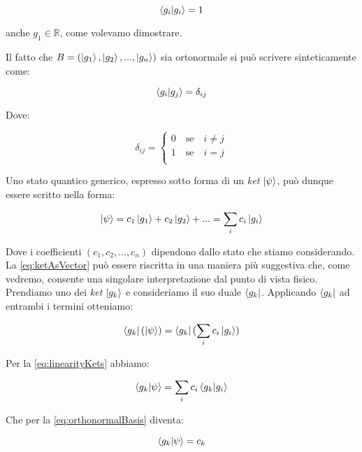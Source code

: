     \[
        \braket{g_i}{g_i} = 1
    \]
    
anche $g_1 \in \mathbb{R}$, come volevamo dimostrare.
    
Il fatto che $B = ( \ket{g_1}, \ket{g_2}, ..., \ket{g_n} ) $ sia ortonormale si può scrivere sinteticamente come: 

	\begin{equation} \label{eq:orthonormalBasis}
		\braket{g_i}{g_j} = \delta_{ij}
	\end{equation}

Dove:

 	\begin{equation}
		\delta_{ij} = \left \{ \begin{array}{l}
				0 \quad \text{se} \quad i \neq j \\
				1 \quad \text{se} \quad i = j \\
			\end{array}
		\right.
	\end{equation}


Uno stato quantico generico, espresso sotto forma di un \textit{ket} $\ket{\psi}$, può dunque essere scritto nella forma:

	\begin{equation} \label{eq:ketAsVector}
		\ket{\psi} = c_1 \ket{g_1} + c_2 \ket{g_2} + ... = \sum_i c_i \ket{g_i}
	\end{equation}

Dove i coefficienti $(c_1, c_2, ..., c_n)$ dipendono dallo stato che stiamo considerando. La \eqref{eq:ketAsVector} può essere riscritta in una maniera più suggestiva che, come vedremo, consente una singolare interpretazione dal punto di vista fisico. Prendiamo uno dei \textit{ket} $\ket{g_k}$ e consideriamo il suo duale $\bra{g_k}$. Applicando $\bra{g_k}$ ad entrambi i termini otteniamo:

	\begin{equation}
		\bra{g_k}(\ket{\psi}) = \bra{g_k}(\sum_i c_i \ket{g_i})
	\end{equation}

Per la \eqref{eq:linearityKets} abbiamo:

	\begin{equation}
		\braket{g_k}{\psi} = \sum_i c_i \braket{g_k}{g_i}
	\end{equation}

Che per la \eqref{eq:orthonormalBasis} diventa:

	\begin{equation} \label{eq:componentsAsBrakets}
		\braket{g_k}{\psi} = c_k
	\end{equation}

